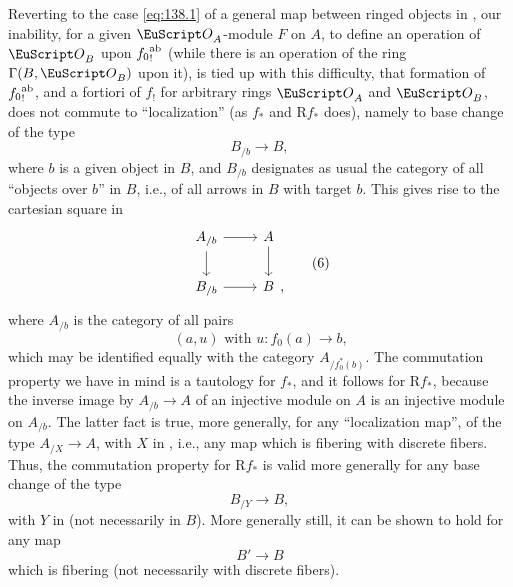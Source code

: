 Reverting to the case \eqref{eq:138.1} of a general map between ringed
objects in \Cat, our inability, for a given $\scrO_A$-module $F$ on
$A$, to define an operation of $\scrO_B$ upon ${f_0}_!^{\mathrm{ab}}$ (while
there is an operation of the ring $\Gamma(B,\scrO_B)$ upon it), is
tied up with this difficulty, that formation of ${f_0}_!^{\mathrm{ab}}$, and a
fortiori of $f_!$ for arbitrary rings $\scrO_A$ and $\scrO_B$, does
not commute to ``localization'' (as $f_*$ and $\mathrm Rf_*$ does),
namely to base change of the type
\begin{equation}
  \label{eq:138.5}
  B_{/b}\to B,\tag{5}
\end{equation}
where $b$ is a given object in $B$, and $B_{/b}$ designates as usual
the category of all ``objects over $b$'' in $B$, i.e., of all arrows
in $B$ with target $b$. This gives rise to the cartesian square in
\Cat{}
\begin{equation}
  \label{eq:138.6}
  \begin{tabular}{@{}c@{}}
    \begin{tikzcd}[baseline=(O.base)]
      A_{/b}\ar[d]\ar[r] & A\ar[d] \\
      B_{/b}\ar[r] & |[alias=O]| B
    \end{tikzcd},
  \end{tabular}\tag{6}
\end{equation}
where $A_{/b}$ is the category of all pairs
\[\text{$(a,u)$ with $u:f_0(a)\to b$,}\]
which may be identified equally with the category $A_{/f_0^*(b)}$. The
commutation property we have in mind is a tautology for $f_*$, and it
follows for $\mathrm Rf_*$, because the inverse image by $A_{/b}\to A$
of an injective module on $A$ is an injective module on $A_{/b}$. The
latter fact is true, more generally, for any ``localization map'', of
the type $A_{/X}\to A$, with $X$ in \Ahat, i.e., any map which is
fibering with discrete fibers. Thus, the commutation property for
$\mathrm Rf_*$ is valid more generally for any base change of the type
\[B_{/Y}\to B,\]
with $Y$ in \Bhat{} (not necessarily in $B$). More generally still, it
can be shown to hold for any map
\[B'\to B\]
which is fibering (not necessarily with discrete fibers).

